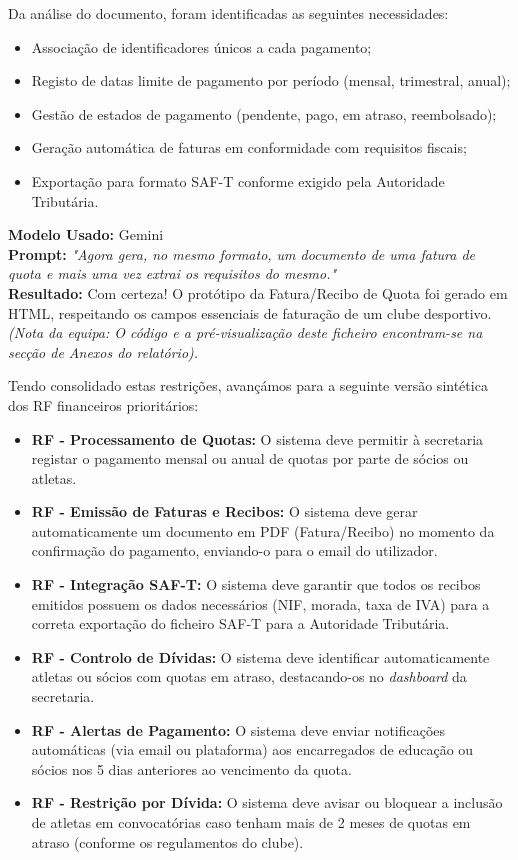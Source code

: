 \documentclass[a4paper,12pt]{scrreprt}
\newcommand{\caixaprompt}[3]{
    \begin{tcolorbox}[
        enhanced,
        colback=azulclaro,      %
        colframe=blue!50!black, %
        arc=2mm,                %
        boxrule=0.5mm,          %
        title=\textbf{Documentação de IA}, %
        fonttitle=\sffamily,
        coltitle=black,
        attach title to upper,
        after title={\par\medskip},
    ]
        \textbf{Modelo Usado:} #1 \\
        \textbf{Prompt:} \textit{"#2"} \\
        \tcbline %
        \textbf{Resultado:} #3
    \end{tcolorbox}
}
\begin{document}
{Da análise do documento, foram identificadas as seguintes necessidades:
\begin{itemize}
    \item Associação de identificadores únicos a cada pagamento;
    \item Registo de datas limite de pagamento por período (mensal, trimestral, anual);
    \item Gestão de estados de pagamento (pendente, pago, em atraso, reembolsado);
    \item Geração automática de faturas em conformidade com requisitos fiscais;
    \item Exportação para formato SAF-T conforme exigido pela Autoridade Tributária.
\end{itemize}

\caixaprompt{Gemini}{Agora gera, no mesmo formato, um documento de uma fatura de quota e mais uma vez extrai os requisitos do mesmo.}{Com certeza! O protótipo da Fatura/Recibo de Quota foi gerado em HTML, respeitando os campos essenciais de faturação de um clube desportivo. \textit{(Nota da equipa: O código e a pré-visualização deste ficheiro encontram-se na secção de Anexos do relatório).}}



Tendo consolidado estas restrições, avançámos para a seguinte versão sintética dos RF financeiros prioritários:

\begin{itemize}
    \item \textbf{RF - Processamento de Quotas:} O sistema deve permitir à secretaria registar o pagamento mensal ou anual de quotas por parte de sócios ou atletas.
    \item \textbf{RF - Emissão de Faturas e Recibos:} O sistema deve gerar automaticamente um documento em PDF (Fatura/Recibo) no momento da confirmação do pagamento, enviando-o para o email do utilizador.
    \item \textbf{RF - Integração SAF-T:} O sistema deve garantir que todos os recibos emitidos possuem os dados necessários (NIF, morada, taxa de IVA) para a correta exportação do ficheiro SAF-T para a Autoridade Tributária.
    \item \textbf{RF - Controlo de Dívidas:} O sistema deve identificar automaticamente atletas ou sócios com quotas em atraso, destacando-os no \textit{dashboard} da secretaria.
    \item \textbf{RF - Alertas de Pagamento:} O sistema deve enviar notificações automáticas (via email ou plataforma) aos encarregados de educação ou sócios nos 5 dias anteriores ao vencimento da quota.
    \item \textbf{RF - Restrição por Dívida:} O sistema deve avisar ou bloquear a inclusão de atletas em convocatórias caso tenham mais de 2 meses de quotas em atraso (conforme os regulamentos do clube).
\end{itemize}

}
\end{document}
